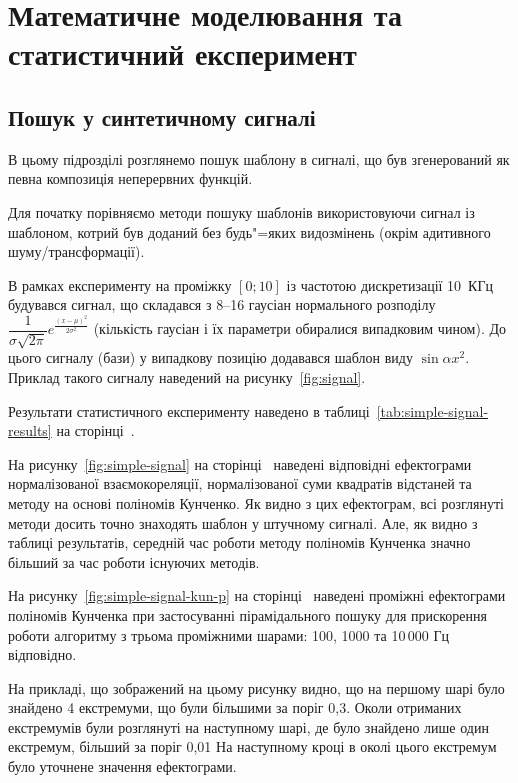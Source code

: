 \chapter{Математичне моделювання та статистичний експеримент}
\label{chap:testing}

\section{Пошук у синтетичному сигналі}
    В цьому підрозділі розглянемо пошук шаблону в сигналі, що був згенерований як певна композиція неперервних
    функцій.

    Для початку порівняємо методи пошуку шаблонів використовуючи сигнал із шаблоном, котрий був доданий без
    будь"=яких видозмінень (окрім адитивного шуму/трансформації).

    В рамках експерименту на проміжку ${[0; 10]}$ із частотою дискретизації 10~КГц будувався сигнал, що складався
    з 8--16 гаусіан нормального розподілу $\dfrac{1}{\sigma\sqrt{2\pi}}
    e^{\frac{{\left(x-\mu\right)}^2}{2\sigma^2}}$
    (кількість гаусіан і їх параметри обиралися випадковим чином).
    До цього сигналу (бази) у випадкову позицію додавався шаблон виду $\sin{\alpha x^2}$.
    Приклад такого сигналу наведений на рисунку~\ref{fig:signal}.

    Результати статистичного експерименту наведено в таблиці~\ref{tab:simple-signal-results} на
    сторінці~\pageref{tab:simple-signal-results}.

    На рисунку~\ref{fig:simple-signal} на сторінці~\pageref{fig:simple-signal} наведені відповідні ефектограми
    нормалізованої взаємокореляції, нормалізованої суми квадратів відстаней та методу на основі поліномів Кунченко.
    Як видно з цих ефектограм, всі розглянуті методи досить точно знаходять шаблон у штучному сигналі.
    Але, як видно з таблиці результатів, середній час роботи методу поліномів Кунченка значно більший за час роботи
    існуючих методів.

    На рисунку~\ref{fig:simple-signal-kun-p} на сторінці~\pageref{fig:simple-signal-kun-p} наведені проміжні
    ефектограми поліномів Кунченка при застосуванні пірамідального пошуку для прискорення роботи алгоритму з трьома
    проміжними шарами: 100, 1000 та 10\,000 Гц відповідно.

    На прикладі, що зображений на цьому рисунку видно, що на першому шарі було знайдено 4 екстремуми, що були більшими
    за поріг 0,3.
    Околи отриманих екстремумів були розглянуті на наступному шарі, де було знайдено лише один екстремум, більший за
    поріг 0,01
    На наступному кроці в околі цього екстремум було уточнене значення ефектограми.

